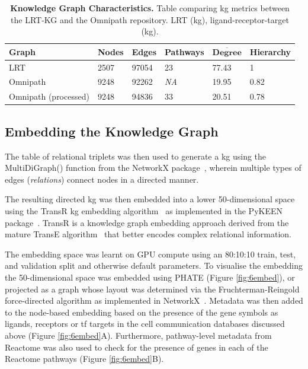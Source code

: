 \begingroup %
\renewcommand{\arraystretch}{1.2} %
    \begin{table}
    \centering
        \begin{tabular}{| p{1.8cm} p{1.8cm} p{1.8cm} p{1.8cm} p{1.8cm} p{1.8cm} |}
            \hline
            \textbf{Graph} & \textbf{Nodes} & \textbf{Edges} & \textbf{Pathways} & $\overline{\textbf{Degree}}$ & \textbf{Hierarchy} \\
            \hline\hline
            LRT & 2507 & 97054 & 23 & 77.43 & 1 \\
            \hline
            Omnipath & 9248 & 92262 & \textit{NA} & 19.95 & 0.82 \\
            \hline
            Omnipath (processed) & 9248 & 94836 & 33 & 20.51 & 0.78 \\
            \hline
        \end{tabular}
    \caption{\textbf{Knowledge Graph Characteristics.} Table comparing \acrshort{kg} metrics between the LRT-KG and the Omnipath repository. LRT (\acrshort{kg}), ligand-receptor-target (\acrshort{kg}).}
    \label{tab:2kg}
    \end{table}
\endgroup


\subsection{Embedding the Knowledge Graph}

The table of relational triplets was then used to generate a \acrshort{kg} using the MultiDiGraph() function from the NetworkX package~\cite{hagberg_exploring_2008}, wherein multiple types of edges (\emph{relations}) connect nodes in a directed manner. 

The resulting directed \acrshort{kg} was then embedded into a lower 50-dimensional space using the TransR \acrshort{kg} embedding algorithm~\cite{zhang_transr_2021} as implemented in the PyKEEN package~\cite{ali_pykeen_2021}. TransR is a knowledge graph embedding approach derived from the mature TransE algorithm~\cite{bordes_translating_2013} that better encodes complex relational information. 

The embedding space was learnt on GPU compute using an 80:10:10 train, test, and validation split and otherwise default parameters.
To visualise the embedding the 50-dimensional space was embedded using PHATE (Figure \ref{fig:6embed}), or projected as a graph whose layout was determined via the Fruchterman-Reingold force-directed algorithm as implemented in NetworkX~\cite{fruchterman_graph_1991}.
Metadata was then added to the node-based embedding based on the presence of the gene symbols as ligands, receptors or \acrshort{tf} targets in the cell communication databases discussed above (Figure \ref{fig:6embed}A). Furthermore, pathway-level metadata from Reactome was also used to check for the presence of genes in each of the Reactome pathways (Figure \ref{fig:6embed}B).


